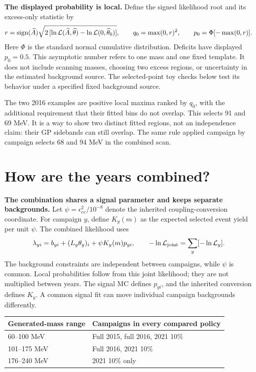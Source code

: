 \documentclass[11pt]{article}
\newcommand{\Ah}{\widehat A}\newcommand{\sh}{\widehat\sigma}
\begin{document}
\textbf{The displayed probability is local.} Define the signed likelihood root and its excess-only statistic by
\[
 r={\rm sign}(\Ah)\sqrt{2\,[\ln\mathcal L(\Ah,\widehat\theta)-\ln\mathcal L(0,\widehat\theta_0)]},
 \qquad q_0=\max(0,r)^2,\qquad p_0=\Phi[-\max(0,r)].
\]
Here $\Phi$ is the standard normal cumulative distribution. Deficits have displayed $p_0=0.5$. This asymptotic number refers to one mass and one fixed template. It does not include scanning masses, choosing two excess regions, or uncertainty in the estimated background source. The selected-point toy checks below test its behavior under a specified fixed background source.

The two 2016 examples are positive local maxima ranked by $q_0$, with the additional requirement that their fitted bins do not overlap. This selects 91 and 69 MeV. It is a way to show two distinct fitted regions, not an independence claim: their GP sidebands can still overlap. The same rule applied campaign by campaign selects 68 and 94 MeV in the combined scan.

\clearpage\section*{How are the years combined?}

\textbf{The combination shares a signal parameter and keeps separate backgrounds.} Let $\psi=\epsilon^2_{ee}/10^{-8}$ denote the inherited coupling-conversion coordinate. For campaign $y$, define $K_y(m)$ as the expected selected event yield per unit $\psi$. The combined likelihood uses
\[
 \lambda_{yi}=b_{yi}+(L_y\theta_y)_i+\psi K_y(m)p_{yi},
 \qquad -\ln\mathcal L_{\rm joint}=\sum_y[-\ln\mathcal L_y].
\]
The background constraints are independent between campaigns, while $\psi$ is common. Local probabilities follow from this joint likelihood; they are not multiplied between years. The signal MC defines $p_{yi}$, and the inherited conversion defines $K_y$. A common signal fit can move individual campaign backgrounds differently.

\begin{center}\begin{tabular}{ll}\toprule
Generated-mass range & Campaigns in every compared policy\\\midrule
60--100 MeV & Full 2015, full 2016, 2021 10\%\\
101--175 MeV & Full 2016, 2021 10\%\\
176--240 MeV & 2021 10\% only\\\bottomrule
\end{tabular}\end{center}
\end{document}
